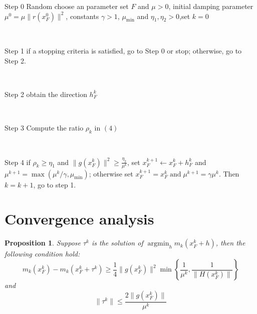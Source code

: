 \documentclass{article}
\newcommand{\matheuler}{\gamma}
\newcommand{\tmop}[1]{\ensuremath{\operatorname{#1}}}
\newenvironment{tmindent}{\begin{tmparmod}{1.5em}{0pt}{0pt}}{\end{tmparmod}}
\newenvironment{tmparmod}[3]{\begin{list}{}{\setlength{\topsep}{0pt}\setlength{\leftmargin}{#1}\setlength{\rightmargin}{#2}\setlength{\parindent}{#3}\setlength{\listparindent}{\parindent}\setlength{\itemindent}{\parindent}\setlength{\parsep}{\parskip}} \item[]}{\end{list}}
\newenvironment{tmparsep}[1]{\begingroup\setlength{\parskip}{#1}}{\endgroup}
\newtheorem{proposition}{Proposition}
\begin{document}
{{\begin{flushleft}
\begin{flushleft}
\begin{tmparmod}{0pt}{0pt}{0em}
\begin{tmparsep}{0em}
        \begin{tmindent}
          Step 0 Random choose an parameter set $F$ and $\mu > 0$, initial
          damping parameter $\mu^0 = \mu \| r (x_F^0) \|^2$, constants
          $\matheuler > 1$, $\mu_{\min}$ and $\eta_1, \eta_2 > 0$,set $k = 0$
          
          \
          
          Step 1 if a stopping criteria is satisfied, go to Step 0 or stop;
          otherwise, go to {\hspace{}}Step 2.
          
          \
          
          Step 2 obtain the direction $h_F^k$
          
          \
          
          Step 3 Compute the ratio $\rho_k $ in $(4)$
          
          \
          
          Step 4 if $\rho_k \geqslant \eta_1$ and $\| g (x_F^k) \|^2
          \geqslant \frac{\eta_2}{\mu^k}$, set $x^{k + 1}_F \leftarrow x^k_F +
          h_F^k$ and $\mu^{k + 1} = \max (\mu^k / \matheuler, \mu_{\min})$;
          otherwise set $x_F^{k + 1} = x_F^k \tmop{and} \mu^{k + 1} =
          \matheuler \mu^k $. Then $k = k + 1$, go to step 1.
        \end{tmindent}
      \end{tmparsep}
    \end{tmparmod}{\medskip}
  \end{flushleft}
\end{flushleft}

\section{Convergence analysis}

\begin{proposition}
  Suppose $\tau^k$ is the solution of $\tmop{argmin}_h m_k (x_F^k + h)$, then
  the following condition hold:
  \begin{equation}
    m_k (x^k_F) - m_k (x^k_F + \tau^k) \geqslant \frac{1}{4}  \| g (x_F^k)
    \|^2 \min \left\{ \frac{1}{\mu^k}, \frac{1}{\| H (x_F^k) \|} \right\}
  \end{equation}
  and
  \begin{equation}
    \| \tau^k \| \leqslant \frac{2 \| g (x_F^k) \|}{\mu^k}
  \end{equation}
\end{proposition}

}}
\end{document}
